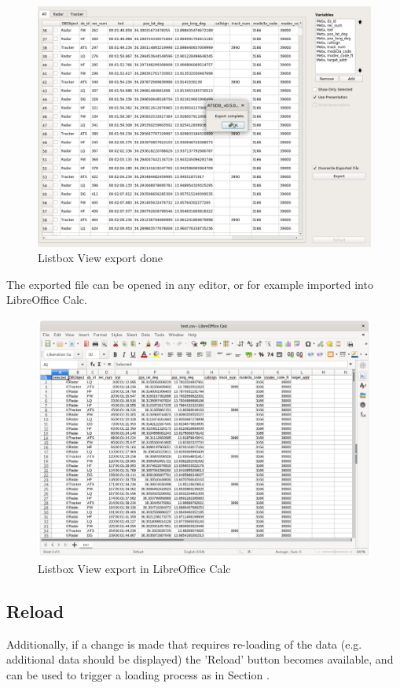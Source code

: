 \begin{figure}[H]
  \center
    \includegraphics[width=18cm,frame]{../screenshots/listbox_exported.png}
  \caption{Listbox View export done}
\end{figure}

The exported file can be opened in any editor, or for example imported into LibreOffice Calc.

\begin{figure}[H]
    \hspace*{-2.5cm}
    \includegraphics[width=19cm]{../screenshots/listbox_exported_calc.png}
  \caption{Listbox View export in LibreOffice Calc}
\end{figure}
 
\subsection{Reload}

Additionally, if a change is made that requires re-loading of the data (e.g. additional data should be displayed) the 'Reload' button becomes available, and can be used to trigger a loading process as in Section . 
